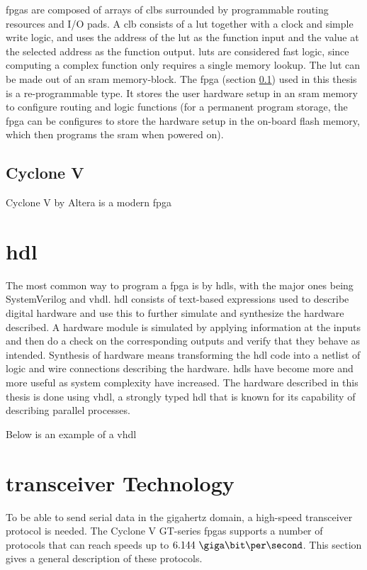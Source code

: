 \documentclass[main.tex]{subfiles}
\begin{document}
\Glspl{fpga} are composed of arrays of \glspl{clb} surrounded by programmable routing resources and I/O pads. A \gls{clb} consists of a \gls{lut} together with a clock and simple write logic, and uses the address of the \gls{lut} as the function input and the value at the selected address as the function output. \glspl{lut} are considered fast logic, since computing a complex function only requires a single memory lookup. The \gls{lut} can be made out of an \gls{sram} memory-block. \cite{weste11} 
The \gls{fpga} (section \ref{sec:cyclone}) used in this thesis is a re-programmable type. It stores the user hardware setup in an \gls{sram} memory to configure routing and logic functions (for a permanent program storage, the \gls{fpga} can be configures to store the hardware setup in the on-board \gls{flash} memory, which then programs the \gls{sram} when powered on).

\subsection{Cyclone V} \label{sec:cyclone}
Cyclone V by Altera is a modern \gls{fpga} 

\section{\acrfull{hdl}}
The most common way to program a \gls{fpga} is by \glspl{hdl}, with the major ones being SystemVerilog and \acrshort{vhdl}. \Gls{hdl} consists of text-based expressions used to describe digital hardware and use this to further simulate and synthesize the hardware described. A hardware module is simulated by applying information at the inputs and then do a check on the corresponding outputs and verify that they behave as intended. Synthesis of hardware means transforming the \gls{hdl} code into a netlist of logic and wire connections describing the hardware. \glspl{hdl} have become more and more useful as system complexity have increased. \cite{weste11} The hardware described in this thesis is done using \acrshort{vhdl}, a strongly typed \gls{hdl} that is known for its capability of describing parallel processes. 

Below is an example of a \gls{vhdl} 


\section{\Gls{transceiver} Technology}

To be able to send serial data in the gigahertz domain, a high-speed transceiver protocol is needed. The Cyclone V GT-series \glspl{fpga} supports a number of protocols that can reach speeds up to $6.144\ \giga\bit\per\second$. This section gives a general description of these protocols.
\end{document}
